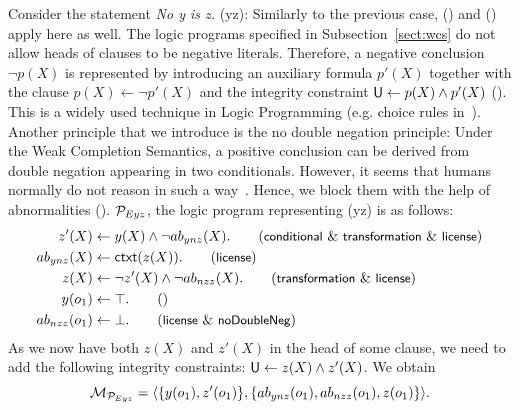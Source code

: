 \documentclass[12pt]{article}
\begin{document}
Consider the statement \textit{No y is z.} ({\ME yz}):
Similarly to the previous case, (\licenses) and () apply here
as well.
The logic programs specified in Subsection~\ref{sect:wcs} 
do not allow heads of clauses to be negative literals. Therefore, a negative conclusion~$\neg p(X)$ is represented
by introducing an auxiliary formula $p'(X)$ together with the clause $p(X) \leftarrow \neg p'(X)$ and the integrity constraint $\mathsf{U} \leftarrow p(X) \wedge p'(X)$ (\transformation). This is a widely used technique in Logic Programming (e.g. choice rules in~\cite{GebserKaminskiKaufmannSchaub12}). 
Another principle that we introduce is the no double negation principle: Under the Weak Completion Semantics, a positive conclusion can be derived from double negation appearing in two conditionals. However, it seems that humans normally do not reason in such a way~\cite{khemlani:2012}. Hence, we block them with the help of abnormalities (\dnegation). ${\cal P}_{Eyz}$, the logic program representing (\ME yz) is as follows:
\begin{align}
 z'(X) & \leftarrow y(X) \wedge \neg \Ab_{ynz}(X).  \tag{\conditionals\ \&\ \transformation\ \&\  \licenses} \\
\Ab_{ynz}(X)  & \leftarrow \cxt(z(X)).\tag{\licenses} \\
z(X) & \leftarrow \neg z'(X) \wedge \neg \Ab_{nzz}(X). \tag{\transformation\ \&\ \licenses} \\
y(o_1) & \leftarrow \top. \tag{} \\
\Ab_{nzz}(o_1) & \leftarrow \bot. \tag{\licenses\ \&\  \dnegation}
\end{align}
As we now have both $z(X)$ and $z'(X)$ in the head of some clause, we need to add the 
following integrity constraints: $\mathsf{U} \leftarrow z(X) \wedge
z'(X)$. We obtain 
\[{\cal M}_{{\cal P}_{Eyz}} = \langle \{y(o_1), z'(o_1)\},\{ab_{ynz}(o_1), ab_{nzz}(o_1),  z(o_1)\}
\rangle.
\]
\end{document}
